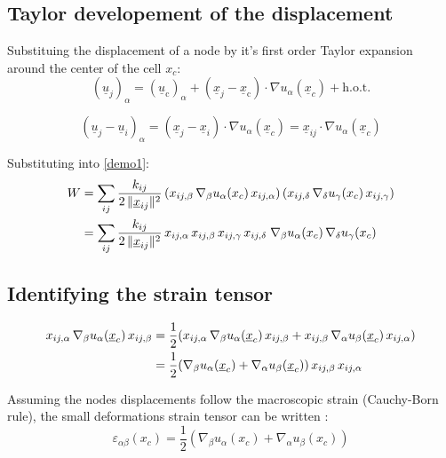 \documentclass[10pt, onecolumn]{article}
\begin{document}
\subsection{Taylor developement of the displacement}
Substituing the displacement of a node by it's first order Taylor expansion around the center of the cell $x_c$:
\begin{equation}
(\underline{u}_j)_\alpha = (\underline{u}_{\text{c}})_\alpha + (\underline{x}_j - \underline{x}_{\text{c}})\cdot \nabla u_\alpha(\underline{x}_c) + \text{h.o.t.}
\label{demo2}
\end{equation}

\begin{equation}
(\underline{u}_j - \underline{u}_i)_\alpha = (\underline{x}_j - \underline{x}_i)\cdot \nabla u_\alpha(\underline{x}_c) = \underline{x}_{ij}\cdot \nabla u_\alpha(\underline{x}_c)
\label{demo3}
\end{equation}

Substituting into \eqref{demo1}:
\begin{align}
W &= \sum_{ij} \frac{k_{ij}}{2\,\|\underline{x}_{ij}\|^2}\left(x_{ij,\beta}\,\nabla_\beta u_\alpha(x_c) \,x_{ij,\alpha}\right)\left(x_{ij,\delta}\,\nabla_\delta u_\gamma(x_c) \,x_{ij,\gamma}\right) \notag \\
&= \sum_{ij} \frac{k_{ij}}{2\,\|\underline{x}_{ij}\|^2}\, x_{ij,\alpha}\,x_{ij,\beta}\,x_{ij,\gamma}\,x_{ij,\delta}\;\nabla_\beta u_\alpha(x_c) \,\nabla_\delta u_\gamma(x_c)
\label{energy1}
\end{align}

\subsection{Identifying the strain tensor}
\begin{align}
    x_{ij,\alpha}\,\nabla_\beta u_\alpha(\underline{x}_c)\,x_{ij,\beta} &= \frac{1}{2} (x_{ij,\alpha}\,\nabla_\beta u_\alpha(\underline{x}_c)\,x_{ij,\beta} + x_{ij,\beta}\,\nabla_\alpha u_\beta(\underline{x}_c)\,x_{ij,\alpha}) \notag
    \\&= \frac{1}{2} (\nabla_\beta u_\alpha(\underline{x}_c) + \nabla_\alpha u_\beta(\underline{x}_c))\,x_{ij,\beta} \,x_{ij,\alpha}
    \label{nabla developpement}
\end{align}

Assuming the nodes displacements follow the macroscopic strain (Cauchy-Born rule), the small deformations strain tensor can be written :
\begin{equation}
    \varepsilon_{\alpha\beta} (x_c) = \frac{1}{2} (\nabla_\beta u_\alpha(x_c) + \nabla_\alpha u_\beta(x_c))
    \label{strain definition}
\end{equation}
\end{document}
